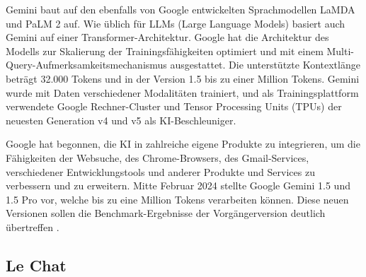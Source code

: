 Gemini baut auf den ebenfalls von Google entwickelten Sprachmodellen LaMDA und PaLM 2 auf. Wie üblich für 
LLMs (Large Language Models) basiert auch Gemini auf einer Transformer-Architektur. Google hat die Architektur des 
Modells zur Skalierung der Trainingsfähigkeiten optimiert und mit einem Multi-Query-Aufmerksamkeitsmechanismus ausgestattet. 
Die unterstützte Kontextlänge beträgt 32.000 Tokens und in der Version 1.5 bis zu einer Million Tokens. Gemini wurde mit 
Daten verschiedener Modalitäten trainiert, und als Trainingsplattform verwendete Google Rechner-Cluster und Tensor 
Processing Units (TPUs) der neuesten Generation v4 und v5 als KI-Beschleuniger.

Google hat begonnen, die KI in zahlreiche eigene Produkte zu integrieren, um die Fähigkeiten der Websuche, des 
Chrome-Browsers, des Gmail-Services, verschiedener Entwicklungstools und anderer Produkte und Services zu verbessern 
und zu erweitern. Mitte Februar 2024 stellte Google Gemini 1.5 und 1.5 Pro vor, welche bis zu eine Million Tokens 
verarbeiten können. Diese neuen Versionen sollen die Benchmark-Ergebnisse der Vorgängerversion deutlich übertreffen \cite{GrundlagenGemini}.

\subsection{Le Chat}  \label{Le Chat}

